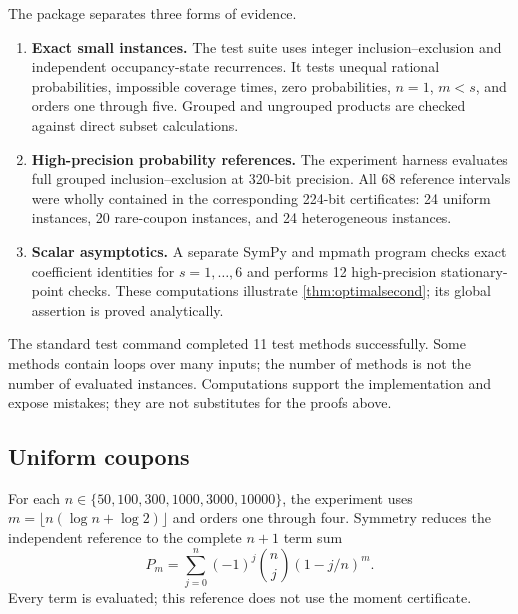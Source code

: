 \documentclass[11pt,a4paper]{article}
\theoremstyle{definition}
\begin{document}
The package separates three forms of evidence.
\begin{enumerate}
\item \textbf{Exact small instances.} The test suite uses integer
inclusion--exclusion and independent occupancy-state recurrences. It
tests unequal rational probabilities, impossible coverage times, zero
probabilities, $n=1$, $m<s$, and orders one through five. Grouped and
ungrouped products are checked against direct subset calculations.
\item \textbf{High-precision probability references.} The experiment
harness evaluates full grouped inclusion--exclusion at 320-bit precision.
All 68 reference intervals were wholly contained in the corresponding
224-bit certificates: 24 uniform instances, 20 rare-coupon instances,
and 24 heterogeneous instances.
\item \textbf{Scalar asymptotics.} A separate SymPy and mpmath program
checks exact coefficient identities for $s=1,\ldots,6$ and performs
12 high-precision stationary-point checks. These computations illustrate
\cref{thm:optimalsecond}; its global assertion is proved analytically.
\end{enumerate}
The standard test command completed 11 test methods successfully. Some
methods contain loops over many inputs; the number of methods is not the
number of evaluated instances. Computations support the implementation
and expose mistakes; they are not substitutes for the proofs above.

\subsection{Uniform coupons}

For each $n\in\{50,100,300,1000,3000,10000\}$, the experiment uses
$m=\lfloor n(\log n+\log2)\rfloor$ and orders one through four.
Symmetry reduces the independent reference to the complete $n+1$ term sum
\begin{equation}\label{eq:uniformreference}
 P_m=\sum_{j=0}^n(-1)^j\binom nj(1-j/n)^m.
\end{equation}
Every term is evaluated; this reference does not use the moment
certificate.
\end{document}
